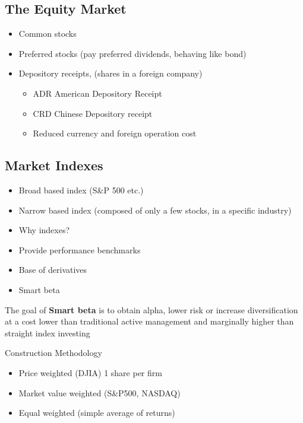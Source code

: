 \documentclass[
]{book}
\providecommand{\tightlist}{%
  \setlength{\itemsep}{0pt}\setlength{\parskip}{0pt}}
\begin{document}
\hypertarget{the-equity-market}{%
\subsection{The Equity Market}\label{the-equity-market}}

\begin{itemize}
\tightlist
\item
  Common stocks
\item
  Preferred stocks (pay preferred dividends, behaving like bond)
\item
  Depository receipts, (shares in a foreign company)

  \begin{itemize}
  \tightlist
  \item
    ADR American Depository Receipt
  \item
    CRD Chinese Depository receipt
  \item
    Reduced currency and foreign operation cost
  \end{itemize}
\end{itemize}

\hypertarget{market-indexes}{%
\subsection{Market Indexes}\label{market-indexes}}

\begin{itemize}
\tightlist
\item
  Broad based index (S\&P 500 etc.)
\item
  Narrow based index (composed of only a few stocks, in a specific
  industry)
\item
  Why indexes?
\item
  Provide performance benchmarks
\item
  Base of derivatives
\item
  Smart beta
\end{itemize}

The goal of \textbf{Smart beta} is to obtain alpha, lower risk or
increase diversification at a cost lower than traditional active
management and marginally higher than straight index investing

Construction Methodology

\begin{itemize}
\tightlist
\item
  Price weighted (DJIA) 1 share per firm
\item
  Market value weighted (S\&P500, NASDAQ)
\item
  Equal weighted (simple average of returns)
\end{itemize}
\end{document}
